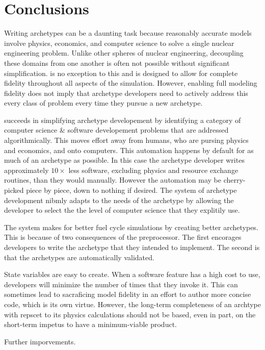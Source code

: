 \section{Conclusions}

Writing archetypes can be a daunting task because reasonably accurate models 
involve physics, economics, and computer science to solve a single nuclear engineering 
problem.  Unlike other spheres of nuclear engineering, decoupling these domains from
one another is often not possible without significant simplification. \cyclus is 
no exception to this and is designed to allow for complete fidelity throughout 
all aspects of the simulation. However, enabling full modeling fidelity does
not imply that archetype developers need to actively address this every class of 
problem every time they pursue a new archetype.

\Cyclus succeeds in simplifying archetype developement by identifying a category 
of computer science \& software developement problems that are addressed 
algorithmically. This moves effort away from humans, who are pursing physics and
economics, and onto computers. This automation happens by default for as much of
an archetype as possible. In this case the archetype developer writes approximately
$10\times$ less software, excluding physics and resource exchange routines, than
they would manually. However the automation may be cherry-picked piece by piece,
down to nothing if desired. The \cyclus system of archetype development nibmly 
adapts to the needs of the archetype by allowing the developer to select the 
the level of computer science that they explitily use.  

The \cyclus system makes for better fuel cycle simulations by creating better 
archetypes.  This is because of two consequences of the preprocessor. The first 
\cyclus encorages developers to write the archetype
that they intended to implement. The second is that the archetypes are automatically
validated.

State variables are easy to create. When a software feature has a high cost to use,
developers will minimize the number of times that they invoke it. This can 
sometimes lead to sacraficing model fidelity in an effort to author more concise
code, which is its own virtue. However, the long-term completeness of an archtype
with repscet to its physics calculations should not be based, even in part, on the
short-term impetus to have a minimum-viable product.

Further imporvements.